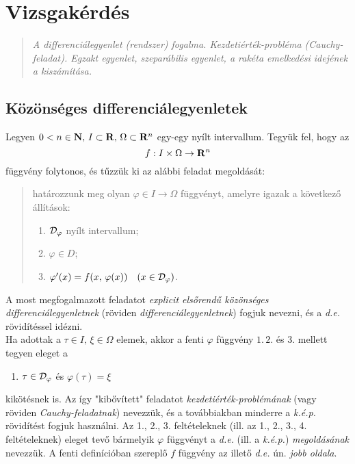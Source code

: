 \newpage
\section{Vizsgakérdés}
\begin{quote}
	\textit{A differenciálegyenlet (rendszer) fogalma. Kezdetiérték-probléma (Cauchy-feladat). Egzakt egyenlet, szeparábilis egyenlet, a rakéta emelkedési idejének a kiszámítása.}
\end{quote}

\subsection{Közönséges differenciálegyenletek}
Legyen $0 < n \in \mathbf{N}, \, I \subset \mathbf{R}, \, \Omega \subset \mathbf{R}^n$ egy-egy nyílt intervallum. Tegyük fel, hogy az
\[
f : I \times \Omega \to \mathbf{R}^n
\]    
függvény folytonos, és tűzzük ki az alábbi feladat megoldását:

\begin{quote}
	határozzunk meg olyan $\varphi \in I \to \Omega$ függvényt, amelyre igazak a következő állítások:
	\begin{enumerate}
		\item $\mathcal{D}_\varphi$ nyílt intervallum;
		\item $\varphi \in D$;
		\item $\varphi'(x) = f(x, \, \varphi(x)) \quad (x \in \mathcal{D}_\varphi)$.
	\end{enumerate}
\end{quote}

A most megfogalmazott feladatot \textit{explicit elsőrendű közönséges differenciálegyenletnek} (röviden \textit{differenciálegyenletnek}) fogjuk nevezni, és a \textit{d.e.} rövidítéssel idézni.\\

Ha adottak a $\tau \in I, \, \xi \in \Omega$ elemek, akkor a fenti $\varphi$ függvény $1. \, 2.$ és 3. mellett tegyen eleget a
\begin{enumerate}[start=4]
	\item $\tau \in \mathcal{D}_\varphi$ és $\varphi(\tau) = \xi$
\end{enumerate}
kikötésnek is. Az így "kibővített" feladatot \textit{kezdetiérték-problémának} (vagy röviden \textit{Cauchy-feladatnak}) nevezzük, és a továbbiakban minderre a \textit{k.é.p.} rövidítést fogjuk használni. Az 1., 2., 3. feltételeknek (ill. az 1., 2., 3., 4. feltételeknek) eleget tevő bármelyik $\varphi$ függvényt a \textit{d.e.} (ill. a \textit{k.é.p.}) \textit{megoldásának} nevezzük. A fenti definícióban szereplő $f$ függvény az illető \textit{d.e.} ún. \textit{jobb oldala}.

